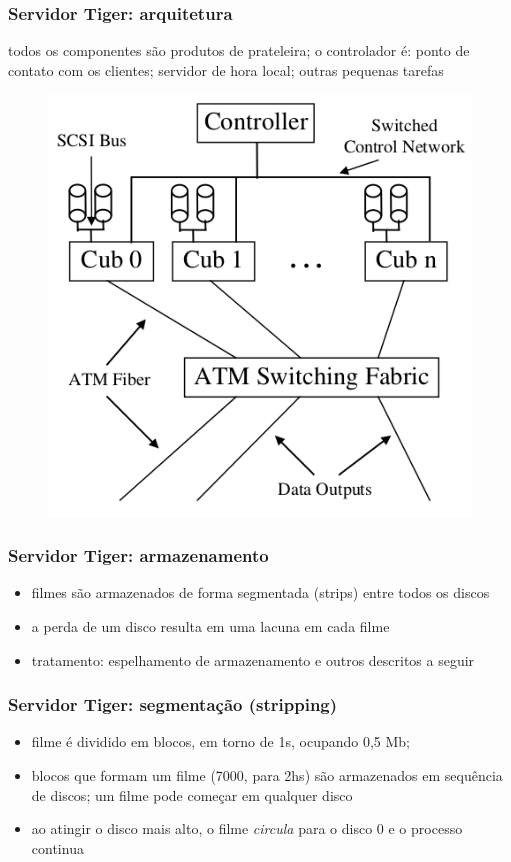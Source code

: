 \documentclass[]{beamer}
\begin{document}
\begin{frame}
 \frametitle{Servidor Tiger: arquitetura}
 todos os componentes são produtos de prateleira;
o controlador é: ponto de contato com os clientes; servidor de hora local; outras
pequenas tarefas\cite{Bolosky:1997}
  \begin{figure}[hbtp]
  \begin{center}
   \includegraphics[scale=0.28]{tiger_architecture.png}
  \end{center}
 \end{figure}
\end{frame}

\begin{frame}
 \frametitle{Servidor Tiger: armazenamento}
 \begin{itemize}
   \item filmes são armazenados de forma segmentada (strips) entre todos os discos
   \item a perda de um disco resulta em uma lacuna em cada filme
   \item tratamento: espelhamento de armazenamento e outros descritos a seguir
  \end{itemize}
\end{frame}

\begin{frame}
 \frametitle{Servidor Tiger: segmentação (stripping)}
 \begin{itemize}
   \item filme é dividido em blocos, em torno de 1s, ocupando 0,5 Mb;
   \item blocos que formam um filme (7000, para 2hs) são armazenados em sequência de discos;
um filme pode começar em qualquer disco
   \item ao atingir o disco mais alto, o filme \emph{circula} para o disco 0 e o
processo continua
  \end{itemize}
\end{frame}
\end{document}
